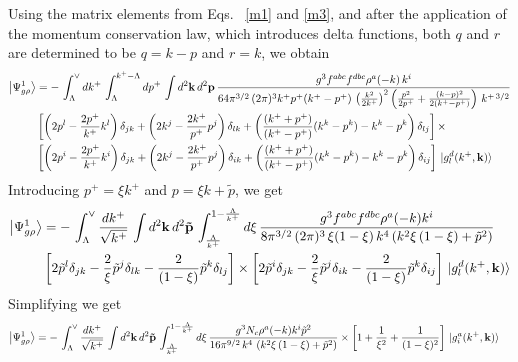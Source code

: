 \documentclass[aps,prd,amsmath,amssymb,nofootinbib]{revtex4-2}
\numberwithin{equation}{section}
\begin{document}
Using the matrix elements from Eqs.~ \eqref{m1} and \eqref{m3}, and after the application of the momentum conservation law, which introduces delta functions, both $q$ and $r$ are determined to be $q = k-p$ and $r=k$, we obtain 
\begin{align}
    \left|\Psi_{g\rho}^{1}\right\rangle & = -\, \int_{\Lambda}^{\vee} dk^{+}\, \int_{\Lambda}^{k^{+}-\Lambda} dp^{+}\, \int d^{2}\mathbf{k}\, d^{2}\mathbf{p}\,\frac{g^{3}f^{abc}f^{dbc}\rho^{a}(-k)\,k^{i}}{64\pi^{3/2}\,(2\pi)^{3}k^{+}p^{+}(k^{+}-p^{+})\,\left(\frac{k^{2}}{2k^{+}}\right)^{2}\left(\frac{p^{2}}{2p^{+}}+\frac{(k-p)^{2}}{2(k^{+}-p^{+})}\right)\,k^{+\,3/2}}\notag \\ & \left[\left(2p^{l}-\frac{2p^{+}}{k^{+}}k^{l}\right)\delta_{jk}+\left(2k^{j}-\frac{2k^{+}}{p^{+}} p^{j}\right)\delta_{lk}+\left(\frac{(k^{+}+p^{+})}{(k^{+}-p^{+})}(k^{k}-p^{k})-k^{k}-p^{k}\right)\delta_{lj}\right]\times \notag \\ & \left[\left(2p^{i}-\frac{2p^{+}}{k^{+}}k^{i}\right)\delta_{jk}+\left(2k^{j}-\frac{2k^{+}}{p^{+}} p^{j}\right)\delta_{ik}+\left(\frac{(k^{+}+p^{+})}{(k^{+}-p^{+})}(k^{k}-p^{k})-k^{k}-p^{k}\right)\delta_{ij}\right]\, \ket{g^{d}_{l}(k^{+},\mathbf{k})}
\end{align}
Introducing $p^{+} = \xi k^{+}$ and $p = \xi k +\tilde{p}$, we get
\begin{align}
    \left|\Psi_{g\rho}^{1}\right\rangle & = -\, \int_{\Lambda}^{\vee} \frac{dk^{+}}{\sqrt{k^{+}}}\,\int d^{2}\mathbf{k}\, d^{2}\mathbf{\tilde{p}}\, \int_{\frac{\Lambda}{k^{+}}}^{1-\frac{\Lambda}{k^{+}}} d\xi\, \frac{g^{3}f^{abc}f^{dbc}\rho^{a}(-k)k^{i}}{8\pi^{3/2}\,(2\pi)^{3}\, \xi(1-\xi)\,k^{4}\left(k^{2}\xi\,(1-\xi)+\tilde{p}^{2}\right)}\notag \\ & \left[2\tilde{p}^{l}\delta_{jk}-\frac{2}{\xi}\tilde{p}^{j}\delta_{lk}-\frac{2}{(1-\xi)}\tilde{p}^{k}\delta_{lj}\right] \times \left[2\tilde{p}^{i}\delta_{jk}-\frac{2}{\xi}\tilde{p}^{j}\delta_{ik}-\frac{2}{(1-\xi)}\tilde{p}^{k}\delta_{ij}\right]\, \ket{g^{d}_{l}(k^{+},\mathbf{k})}
\end{align}
Simplifying we get
\begin{align}
     \left|\Psi_{g\rho}^{1}\right\rangle & = -\, \int_{\Lambda}^{\vee} \frac{dk^{+}}{\sqrt{k^{+}}}\,\int d^{2}\mathbf{k}\, d^{2}\mathbf{\tilde{p}}\, \int_{\frac{\Lambda}{k^{+}}}^{1-\frac{\Lambda}{k^{+}}} d\xi\, \frac{g^{3}N_{c}\rho^{a}(-k)k^{i}\tilde{p}^{2}}{16\pi^{9/2}\, k^{4}\,\left(k^{2}\xi\,(1-\xi)+\tilde{p}^{2}\right)}\times \left[1+\frac{1}{\xi^{2}}+\frac{1}{(1-\xi)^{2}}\right]\,\ket{g^{a}_{i}(k^{+},\mathbf{k})}
\end{align}
\end{document}
